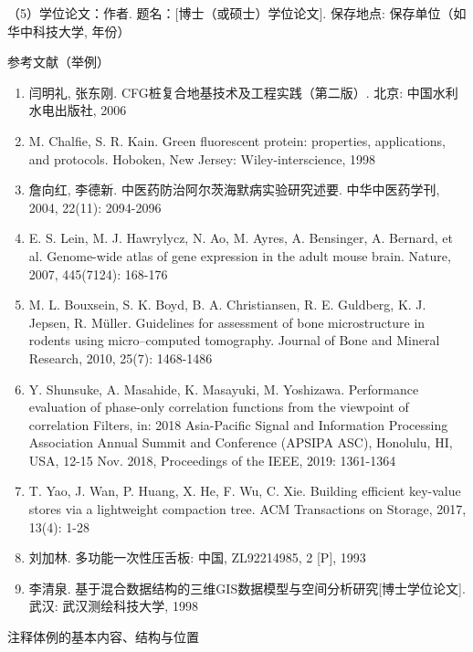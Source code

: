 （5）学位论文：作者. 题名：[博士（或硕士）学位论文]. 保存地点: 保存单位（如华中科技大学, 年份）

参考文献（举例）
\begin{enumerate}
\renewcommand{\labelenumi}{[\theenumi]}
\item	闫明礼, 张东刚. CFG桩复合地基技术及工程实践（第二版）. 北京: 中国水利水电出版社, 2006

\item	M. Chalfie, S. R. Kain. Green fluorescent protein: properties, applications, and protocols. Hoboken, New Jersey: Wiley-interscience, 1998

\item	詹向红, 李德新. 中医药防治阿尔茨海默病实验研究述要. 中华中医药学刊, 2004, 22(11): 2094-2096

\item	E. S. Lein, M. J. Hawrylycz, N. Ao, M. Ayres, A. Bensinger, A. Bernard, et al. Genome-wide atlas of gene expression in the adult mouse brain. Nature, 2007, 445(7124): 168-176

\item	M. L. Bouxsein, S. K. Boyd, B. A. Christiansen, R. E. Guldberg, K. J. Jepsen, R. Müller. Guidelines for assessment of bone microstructure in rodents using micro–computed tomography. Journal of Bone and Mineral Research, 2010, 25(7): 1468-1486

\item	Y. Shunsuke, A. Masahide, K. Masayuki, M. Yoshizawa. Performance evaluation of phase-only correlation functions from the viewpoint of correlation Filters, in: 2018 Asia-Pacific Signal and Information Processing Association Annual Summit and Conference (APSIPA ASC), Honolulu, HI, USA, 12-15 Nov. 2018, Proceedings of the IEEE, 2019: 1361-1364

\item	T. Yao, J. Wan, P. Huang, X. He, F. Wu, C. Xie. Building efficient key-value stores via a lightweight compaction tree. ACM Transactions on Storage, 2017, 13(4): 1-28

\item	刘加林. 多功能一次性压舌板: 中国, ZL92214985, 2 [P], 1993

\item	李清泉. 基于混合数据结构的三维GIS数据模型与空间分析研究[博士学位论文]. 武汉: 武汉测绘科技大学, 1998

\end{enumerate}

注释体例的基本内容、结构与位置

